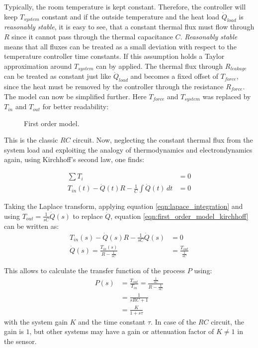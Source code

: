 Typically, the room temperature is kept constant. Therefore, the controller will keep $T_{system}$ constant and if the outside temperature and the heat load $\dot Q_{load}$ is \textit{reasonably stable}, it is easy to see, that a constant thermal flux must flow through $R$ since it cannot pass through the thermal capacitance $C$. \textit{Reasonably stable} means that all fluxes can be treated as a small deviation with respect to the temperature controller time constants. If this assumption holds a Taylor approximation around $T_{system}$ can by applied. The thermal flux through $R_{leakage}$ can be treated as constant just like $\dot Q_{load}$ and becomes a fixed offset of $T_{force}$, since the heat must be removed by the controller through the resistance $R_{force}$. The model can now be simplified further. Here $T_{force}$ and $T_{system}$ was replaced by $T_{in}$ and $T_{out}$ for better readability:

\begin{figure}[hb]
    \centering
    \caption{First order model.}
    \label{fig:first_order_model}
\end{figure}

This is the classic $RC$ circuit. Now, neglecting the constant thermal flux from the system load and exploiting the analogy of thermodynamics and electrondynamics again, using Kirchhoff's second law, one finds:

\begin{align}
    \sum T_i &= 0 \nonumber\\
    T_{in}(t) - \dot{Q}(t) R - \frac 1 C \int \dot{Q}(t)\,dt &= 0 \label{eqn:first_order_model_kirchhoff}
\end{align}

Taking the Laplace transform, applying equation \ref{eqn:lapace_integration} and using $T_{out} = \frac{1}{sC} \dot Q(s)$ to replace $\dot Q$, equation \ref{eqn:first_order_model_kirchhoff} can be written as:
\begin{align*}
    T_{in}(s) - \dot{Q}(s) R - \frac{1}{sC} \dot{Q}(s) &= 0\\
    \dot{Q}(s) = \frac{T_{in}(s)}{R-\frac{1}{sC}} &= \frac{T_{out}}{\frac{1}{sC}}
\end{align*}

This allows to calculate the transfer function of the process $P$ using:
\begin{align}
    P(s) &= \frac{T_{out}}{T_{in}} = \frac{\frac{1}{sC}}{R-\frac{1}{sC}} \nonumber\\
    &= \frac{1}{sRC + 1} \nonumber\\
    &= \frac{K}{1 + s\tau} \label{eqn:first_order_model}
\end{align}
with the system gain $K$ and the time constant $\tau$. In case of the $RC$ circuit, the gain is $1$, but other systems may have a gain or attenuation factor of $K \neq 1$ in the sensor.

